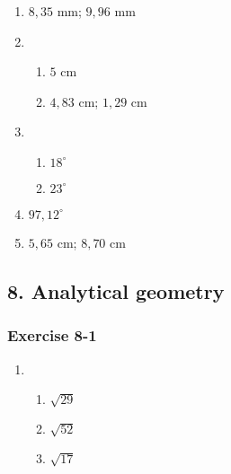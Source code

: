 {\begin{multicols}{3}
\begin{enumerate}[noitemsep, label=\textbf{\arabic*}. ]
\item $8,35$ mm; $9,96$ mm%
\item %
\begin{enumerate}[noitemsep, label=\textbf{(\alph*)} ]
\item $5$ cm%
\item $4,83$ cm; $1,29$ cm%
\end{enumerate} 
\item %
\begin{enumerate}[noitemsep, label=\textbf{(\alph*)} ] 
\item $18^{\circ}$%
\item $23^{\circ}$%
\end{enumerate} 
\item $97,12^{\circ}$%
\item $5,65$ cm; $8,70$ cm%
\end{enumerate}
\end{multicols}

\subsection* {8. Analytical geometry}
\begin{multicols}{3}
\subsubsection*{Exercise 8-1} %
\begin{enumerate}[label=\textbf{\arabic*}.]
\item %
 \begin{enumerate}[noitemsep, label=\textbf{(\alph*)} ] 
\item $\sqrt{29}$%
\item $\sqrt{52}$%
\item $\sqrt{17}$%
\end{enumerate}


\end{enumerate}
\end{multicols}}
